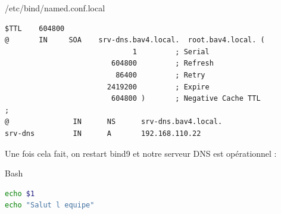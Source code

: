 \documentclass{article}
\begin{document}
\begin{configbox}{/etc/bind/named.conf.local}
\begin{lstlisting}
$TTL    604800
@       IN     SOA    srv-dns.bav4.local.  root.bav4.local. (
                              1         ; Serial
                         604800         ; Refresh
                          86400         ; Retry
                        2419200         ; Expire
                         604800 )       ; Negative Cache TTL
;
@               IN      NS      srv-dns.bav4.local.
srv-dns         IN      A       192.168.110.22
\end{lstlisting}
\end{configbox}
Une fois cela fait, on restart bind9 et notre serveur DNS est opérationnel :

\begin{codebox}{Bash}
\begin{lstlisting}[language=Bash]
echo $1
echo "Salut l equipe"

\end{lstlisting}
\end{codebox}
\end{document}
